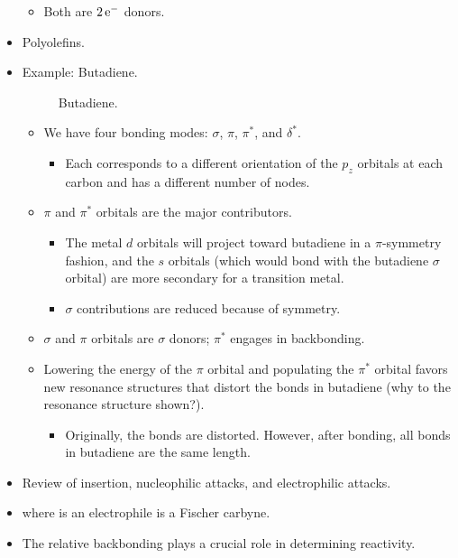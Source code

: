 \documentclass[../notes.tex]{subfiles}
\begin{document}
\begin{itemize}
\begin{itemize}
        \item Both are $2\,\e[-]$ donors.
    \end{itemize}
    \item Polyolefins.
    \item Example: Butadiene.
    \begin{figure}[h!]
        \centering
        \caption{Butadiene.}
        \label{fig:butadiene}
    \end{figure}
    \begin{itemize}
        \item We have four bonding modes: $\sigma$, $\pi$, $\pi^*$, and $\delta^*$.
        \begin{itemize}
            \item Each corresponds to a different orientation of the $p_z$ orbitals at each carbon and has a different number of nodes.
        \end{itemize}
        \item $\pi$ and $\pi^*$ orbitals are the major contributors.
        \begin{itemize}
            \item The metal $d$ orbitals will project toward butadiene in a $\pi$-symmetry fashion, and the $s$ orbitals (which would bond with the butadiene $\sigma$ orbital) are more secondary for a transition metal.
            \item $\sigma$ contributions are reduced because of symmetry.
        \end{itemize}
        \item $\sigma$ and $\pi$ orbitals are $\sigma$ donors; $\pi^*$ engages in backbonding.
        \item Lowering the energy of the $\pi$ orbital and populating the $\pi^*$ orbital favors new resonance structures that distort the bonds in butadiene (why to the resonance structure shown?).
        \begin{itemize}
            \item Originally, the bonds are distorted. However, after bonding, all bonds in butadiene are the same length.
        \end{itemize}
    \end{itemize}
    \item Review of insertion, nucleophilic attacks, and electrophilic attacks.
    \item {} where  is an electrophile is a Fischer carbyne.
    \item The relative backbonding plays a crucial role in determining reactivity.

\end{itemize}
\end{document}
